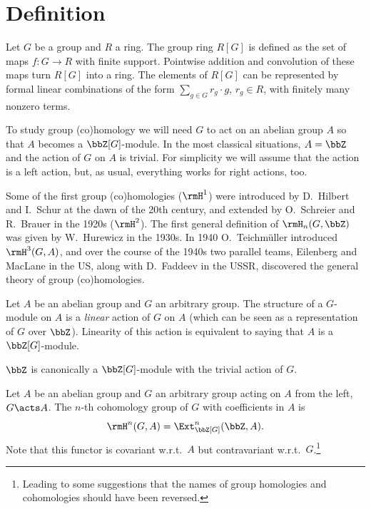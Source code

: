 \section{Definition}


\begin{defn}
    Let $G$ be a group and $R$ a ring. The group ring $R[G]$ is defined as the set of maps $f:G\to R$ with finite support. Pointwise addition and convolution of these maps turn $R[G]$ into a ring. The elements of $R[G]$ can be represented by formal linear combinations of the form $\sum_{g\in G} r_g\cdot g$, $r_g\in R$, with finitely many nonzero terms.
\end{defn}

To study group (co)homology we will need $G$ to act on an abelian group $A$ so that $A$ becomes a $\bbZ[G]$-module. In the most classical situations, $A=\bbZ$ and the action of $G$ on $A$ is trivial. For simplicity we will assume that the action is a left action, but, as usual, everything works for right actions, too. 

\begin{hrem*}
    Some of the first group (co)homologies ($\rmH^1$) were introduced by D.~Hilbert and I.~Schur at the dawn of the 20th century, and extended by O.~Schreier and R.~Brauer in the 1920s ($\rmH^2$). The first general definition of $\rmH_n(G,\bbZ)$ was given by W.~Hurewicz in the 1930s. In 1940 O.~Teichm\"uller introduced $\rmH^3(G,A)$, and over the course of the 1940s two parallel teams, Eilenberg and MacLane in the US, along with D.~Faddeev in the USSR, discovered the general theory of group (co)homologies.
\end{hrem*}

\begin{defn}[$G$-module]
    Let $A$ be an abelian group and $G$ an arbitrary group. The structure of a $G$-module on $A$ is a \emph{linear} action of $G$ on $A$ (which can be seen as a representation of $G$ over $\bbZ$). Linearity of this action is equivalent to saying that $A$ is a $\bbZ[G]$-module.
\end{defn}

\begin{example}
    $\bbZ$ is canonically a $\bbZ[G]$-module with the trivial action of $G$.
\end{example} 

\begin{defn}
    Let $A$ be an abelian group and $G$ an arbitrary group acting on $A$ from the left, $G\acts A$. The $n$-th cohomology group of $G$ with coefficients in $A$ is
    \[\rmH^n(G,A)=\Ext_{\bbZ[G]}^n(\bbZ,A).\]
    Note that this functor is covariant w.r.t.\ $A$ but contravariant w.r.t.\ $G$.\footnote{Leading to some suggestions that the names of group homologies and cohomologies should have been reversed.} 
\end{defn}

